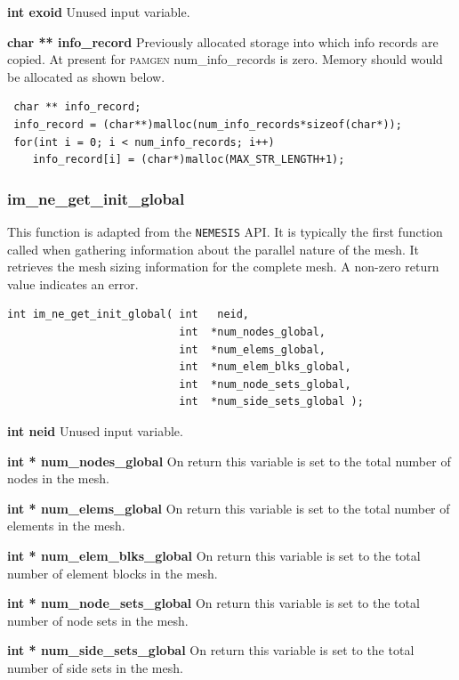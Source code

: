 {\setlength{\parindent}{0pt}
 \textbf{int exoid} Unused input variable.}

{\setlength{\parindent}{0pt}
 \textbf{char ** info\_record} Previously allocated storage into which info records are copied. At present for \textsc{pamgen} num\_info\_records is zero. Memory should would be allocated as  shown below.}
{\ttfamily  \begin{verbatim}
 char ** info_record;
 info_record = (char**)malloc(num_info_records*sizeof(char*));
 for(int i = 0; i < num_info_records; i++)
    info_record[i] = (char*)malloc(MAX_STR_LENGTH+1);
\end{verbatim}}

\subsubsection{im\_ne\_get\_init\_global}
This function is adapted from the \texttt{NEMESIS} API. It is typically the first function called when gathering information about the parallel nature of the mesh. It retrieves the mesh sizing information for the complete mesh. A non-zero return value indicates an error.
{\ttfamily  \begin{verbatim}
int im_ne_get_init_global( int   neid,
                           int  *num_nodes_global,
                           int  *num_elems_global,
                           int  *num_elem_blks_global,
                           int  *num_node_sets_global,
                           int  *num_side_sets_global );
\end{verbatim}}

{\setlength{\parindent}{0pt}
 \textbf{int neid} Unused input variable.}

{\setlength{\parindent}{0pt}
 \textbf{int * num\_nodes\_global} On return this variable is set to the total number of nodes in the mesh.}

{\setlength{\parindent}{0pt}
 \textbf{int * num\_elems\_global} On return this variable is set to the total number of elements in the mesh.}

{\setlength{\parindent}{0pt}
 \textbf{int * num\_elem\_blks\_global} On return this variable is set to the total number of element blocks in the mesh.}

{\setlength{\parindent}{0pt}
 \textbf{int * num\_node\_sets\_global} On return this variable is set to the total number of node sets in the mesh.}

{\setlength{\parindent}{0pt}
 \textbf{int * num\_side\_sets\_global} On return this variable is set to the total number of side sets in the mesh.}


